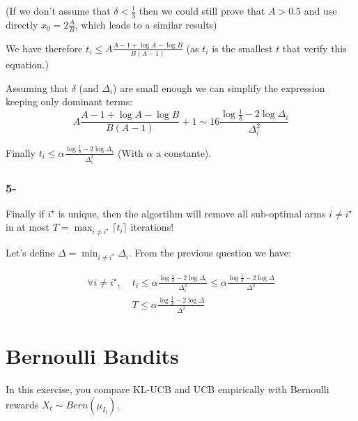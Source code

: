 \documentclass[a4paper]{article}
\begin{document}
(If we don't assume that $\delta < \frac{1}{3}$ then we could still prove that $A > 0.5$ and use directly $x_0 = 2\frac{A}{B}$,
which leads to a similar results)

We have therefore $t_i \le A\frac{A - 1 + \log A - \log B}{B(A -1)}$ (as $t_i$ is the smallest $t$ that verify this equation.)

Assuming that $\delta$ (and $\Delta_i$) are small enough we can simplify the expression keeping only dominant terms:
\begin{equation*}
    A\frac{A - 1 + \log A - \log B}{B(A - 1)} + 1 \sim  16\frac{\log\frac{1}{\delta} - 2\log\Delta_i}{\Delta_i^2}
\end{equation*}

Finally $\boxed{t_i \le \alpha \frac{\log\frac{1}{\delta} - 2\log\Delta_i}{\Delta_i^2}}$ (With $\alpha$ a constante).

\subsubsection*{5-}

Finally if $i^\star$ is unique, then the algortihm will remove all sub-optimal arms $i \neq i^\star$ in at most
$T = \max_{i \neq i^\star} \lceil t_i \rceil$ iterations!

Let's define $\Delta = \min_{i \neq i^\star} \Delta_i$. From the previous question we have:

\begin{equation*}
    \begin{aligned}
        \forall i \neq i^\star,\; & t_i \le \alpha \frac{\log\frac{1}{\delta} - 2\log\Delta_i}{\Delta_i^2} \le \alpha \frac{\log\frac{1}{\delta} - 2\log\Delta}{\Delta^2} \\
                                  & \boxed{T \le \alpha \frac{\log\frac{1}{\delta} - 2\log\Delta}{\Delta^2}}
    \end{aligned}
\end{equation*}


\section{Bernoulli Bandits}
In this exercise, you compare KL-UCB and UCB empirically with Bernoulli rewards $X_t \sim Bern(\mu_{I_t})$.
\end{document}
